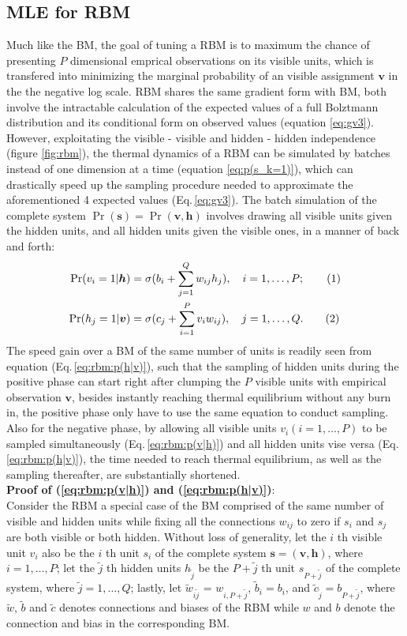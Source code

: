 \documentclass[11pt]{article}
\newcommand\numberthis{\addtocounter{equation}{1}\tag{\theequation}}
\newcommand{\vh}{\boldsymbol{h}}
\newcommand{\vv}{\boldsymbol{v}}
\newcommand{\vs}{\boldsymbol{s}}
\begin{document}
{\subsection{MLE for RBM}
Much like the BM, the goal of tuning a RBM is to maximum the chance of presenting $P$ dimensional emprical observations on its visible units, which is transfered into minimizing the marginal probability of an visible assignment $\vv$ in the the negative log scale. RBM shares the same gradient form with BM, both involve the intractable calculation of the expected values of a full Bolztmann distribution and its conditional form on observed values (equation \ref{eq:gv3}). However, exploitating the visible - visible and hidden - hidden independence (figure \ref{fig:rbm}), the thermal dynamics of a RBM can be simulated by batches instead of one dimension at a time (equation \ref{eq:p(s_k=1)}), which can drastically speed up the sampling procedure needed to approximate the aforementioned 4 expected values (Eq.\,\ref{eq:gv3}). The batch simulation of the complete system $\Pr(\vs)=\Pr(\vv, \vh)$ involves drawing all visible units given the hidden units, and all hidden units given the visible ones, in a manner of back and forth:
\begin{align*}
  \Pr(v_i=1|\vh) & = \sigma(b_i + \sum_{j=1}^Q{w_{ij} h_j}), \quad i = 1, \dots, P; \numberthis \label{eq:rbm:p(v|h)} \\
  \Pr(h_j=1|\vv) & = \sigma(c_j + \sum_{i=1}^P{v_i w_{ij}}), \quad j = 1, \dots, Q. \numberthis \label{eq:rbm:p(h|v)}
\end{align*}
The speed gain over a BM of the same number of units is readily seen from equation (Eq.\,\ref{eq:rbm:p(h|v)}), such that the sampling of hidden units during the positive phase can start right after clumping the $P$ visible units with empirical observation $\vv$, besides instantly reaching thermal equilibrium without any burn in, the positive phase only have to use the same equation to conduct sampling. Also for the negative phase, by allowing all visible units $v_i (i=1, \dots, P)$ to be sampled simultaneously (Eq.\,\ref{eq:rbm:p(v|h)}) and all hidden units vise versa (Eq.\,\ref{eq:rbm:p(h|v)}), the time needed to reach thermal equilibrium, as well as the sampling thereafter, are substantially shortened. \\
\textbf{Proof of (\ref{eq:rbm:p(v|h)}) and (\ref{eq:rbm:p(h|v)})}: \\
\newcommand{\jt}{\tilde{j}}
\newcommand{\wt}{\tilde{w}}
\newcommand{\bt}{\tilde{b}}
\newcommand{\ct}{\tilde{c}}
Consider the RBM a special case of the BM comprised of the same number of visible and hidden units while fixing all the connections $w_{ij}$ to zero if $s_i$ and $s_j$ are both visible or both hidden. Without loss of generality, let the $i$ th visible unit $v_i$ also be the $i$ th unit $s_i$ of the complete system $\vs=(\vv, \vh)$, where $i=1, \dots, P$; let the $\jt$ th hidden units $h_{\jt}$ be the $P+\jt$ th unit $s_{P+\jt}$ of the complete system, where $\jt=1, \dots, Q$; lastly, let $\wt_{i\jt}$ = $w_{i,P+\jt}$, $\bt_i = b_i$, and $\ct_{\jt} = b_{P+\jt}$, where $\wt$, $\bt$ and $\ct$ denotes connections and biases of the RBM while $w$ and $b$ denote the connection and bias in the corresponding BM.
}
\end{document}
